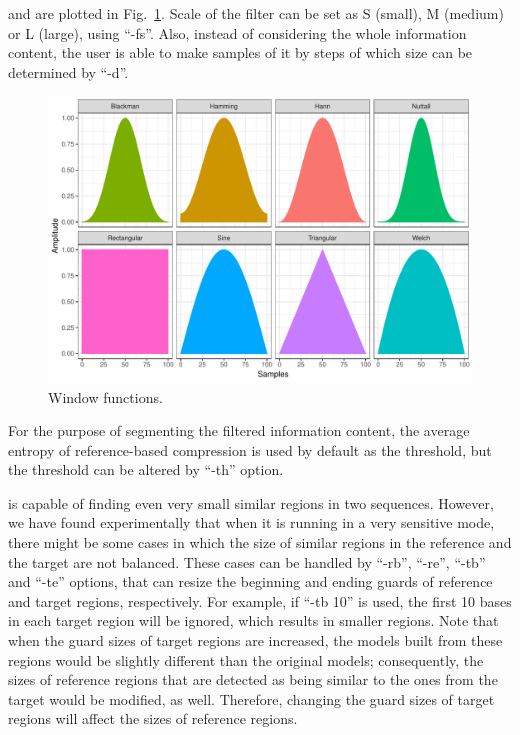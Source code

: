 and are plotted in Fig.~\ref{fig.filters}.
Scale of the filter can be set as S (small), M (medium) or L (large), using ``-fs''.
Also, instead of considering the whole information content, the user is able to make samples of it by steps of which size can be determined by ``-d''.
\begin{figure}[!h]
  \centering
  \includegraphics[width=\linewidth]{filters.pdf}
  \caption{Window functions.}
  \label{fig.filters}
\end{figure}

For the purpose of segmenting the filtered information content, the average entropy of reference-based compression is used by default as the threshold, but the threshold can be altered by ``-th'' option.

\smashpp is capable of finding even very small similar regions in two sequences. However, we have found experimentally that when it is running in a very sensitive mode, there might be some cases in which the size of similar regions in the reference and the target are not balanced. These cases can be handled by ``-rb'', ``-re'', ``-tb'' and ``-te'' options, that can resize the beginning and ending guards of reference and target regions, respectively.
For example, if ``-tb 10'' is used, the first 10 bases in each target region will be ignored, which results in smaller regions.
Note that when the guard sizes of target regions are increased, the models built from these regions would be slightly different than the original models; consequently, the sizes of reference regions that are detected as being similar to the ones from the target would be modified, as well. Therefore, changing the guard sizes of target regions will affect the sizes of reference regions.

